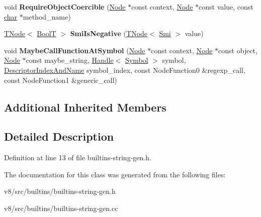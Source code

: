 \begin{DoxyCompactItemize}
\item 
\mbox{\label{classv8_1_1internal_1_1StringBuiltinsAssembler_afc076dfa296653c40e7aef8da4238dfa}} 
void {\bfseries Require\+Object\+Coercible} (\mbox{\hyperlink{classv8_1_1internal_1_1compiler_1_1Node}{Node}} $\ast$const context, \mbox{\hyperlink{classv8_1_1internal_1_1compiler_1_1Node}{Node}} $\ast$const value, const \mbox{\hyperlink{classchar}{char}} $\ast$method\+\_\+name)
\item 
\mbox{\label{classv8_1_1internal_1_1StringBuiltinsAssembler_a48d177cc90b5d39742e06d542c1b2274}} 
\mbox{\hyperlink{classv8_1_1internal_1_1compiler_1_1TNode}{T\+Node}}$<$ \mbox{\hyperlink{structv8_1_1internal_1_1BoolT}{BoolT}} $>$ {\bfseries Smi\+Is\+Negative} (\mbox{\hyperlink{classv8_1_1internal_1_1compiler_1_1TNode}{T\+Node}}$<$ \mbox{\hyperlink{classv8_1_1internal_1_1Smi}{Smi}} $>$ value)
\item 
\mbox{\label{classv8_1_1internal_1_1StringBuiltinsAssembler_a187f15154cfe0204f1b5e530e9289969}} 
void {\bfseries Maybe\+Call\+Function\+At\+Symbol} (\mbox{\hyperlink{classv8_1_1internal_1_1compiler_1_1Node}{Node}} $\ast$const context, \mbox{\hyperlink{classv8_1_1internal_1_1compiler_1_1Node}{Node}} $\ast$const object, \mbox{\hyperlink{classv8_1_1internal_1_1compiler_1_1Node}{Node}} $\ast$const maybe\+\_\+string, \mbox{\hyperlink{classv8_1_1internal_1_1Handle}{Handle}}$<$ \mbox{\hyperlink{classv8_1_1internal_1_1Symbol}{Symbol}} $>$ symbol, \mbox{\hyperlink{structv8_1_1internal_1_1CodeStubAssembler_1_1DescriptorIndexAndName}{Descriptor\+Index\+And\+Name}} symbol\+\_\+index, const Node\+Function0 \&regexp\+\_\+call, const Node\+Function1 \&generic\+\_\+call)
\end{DoxyCompactItemize}
\subsection*{Additional Inherited Members}


\subsection{Detailed Description}


Definition at line 13 of file builtins-\/string-\/gen.\+h.



The documentation for this class was generated from the following files\+:\begin{DoxyCompactItemize}
\item 
v8/src/builtins/builtins-\/string-\/gen.\+h\item 
v8/src/builtins/builtins-\/string-\/gen.\+cc\end{DoxyCompactItemize}

